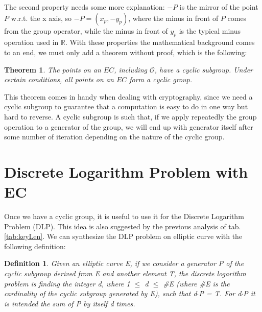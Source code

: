 \documentclass{article}
\newtheorem*{remark}{Theorem}
\newtheorem*{definition}{Definition}
\begin{document}
The second property needs some more explanation: $-P$ is the mirror of the point $P$ w.r.t. the x axis, so $-P = (x_p, -y_p)$, where the minus in front of $P$ comes from the group operator, while the minus in front of $y_p$ is the typical minus operation used in $\mathbb{R}$. With these properties the mathematical background comes to an end, we must only add a theorem without proof, which is the following:

\begin{remark}
	The points on an $EC$, including $\mathcal{O}$, have a cyclic subgroup. Under certain conditions, all points on an $EC$ form a cyclic group.
\end{remark} 

This theorem comes in handy when dealing with cryptography, since we need a cyclic subgroup to guarantee that a computation is easy to do in one way but hard to reverse. A cyclic subgroup is such that, if we apply repeatedly the group operation to a generator of the group, we will end up with generator itself after some number of iteration depending on the nature of the cyclic group.


\section{Discrete Logarithm Problem with EC}

Once we have a cyclic group, it is useful to use it for the Discrete Logarithm Problem (DLP). This idea is also suggested by the previous analysis of tab. \ref{tab:keyLen}.\newline
We can synthesize the DLP problem on elliptic curve with the following definition:

\begin{definition}
	Given an elliptic curve E, if we consider a generator P of the cyclic subgroup derived from E and another element T, the discrete logarithm problem is finding the integer d, where 1 $\leq$ d $\leq$ \#E (where \#E is the cardinality of the cyclic subgroup generated by E), such that d$\cdot$P = T. For d$\cdot$P it is intended the sum of P by itself d times.
\end{definition}
\end{document}
